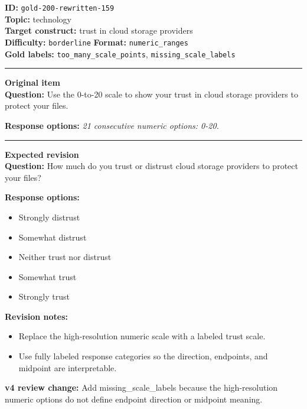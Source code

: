 \documentclass[10pt,a4paper]{article}
\newcommand{\sectionline}{\vspace{0.15em}\hrule\vspace{0.35em}}
\begin{document}
\begin{tcolorbox}[colframe=FlawRed,colback=white,colbacktitle=FlawRed!9,coltitle=black,title={Item 159\hfill Flawed item}]
\textbf{ID:} \texttt{gold-200-rewritten-159}\\
\textbf{Topic:} technology\\
\textbf{Target construct:} trust in cloud storage providers\\
\textbf{Difficulty:} \texttt{borderline} \quad \textbf{Format:} \texttt{numeric\_ranges}\\
\textbf{Gold labels:} \texttt{too\_many\_scale\_points}, \texttt{missing\_scale\_labels}\\
\sectionline
\textbf{Original item}\\
\textbf{Question:} Use the 0-to-20 scale to show your trust in cloud storage providers to protect your files.
\par\textbf{Response options:}
\textit{21 consecutive numeric options: 0-20.}
\sectionline
\textbf{Expected revision}\\
\textbf{Question:} How much do you trust or distrust cloud storage providers to protect your files?
\par\textbf{Response options:}
\begin{itemize}
\item Strongly distrust
\item Somewhat distrust
\item Neither trust nor distrust
\item Somewhat trust
\item Strongly trust
\end{itemize}
\par\textbf{Revision notes:}
\begin{itemize}
\item Replace the high-resolution numeric scale with a labeled trust scale.
\item Use fully labeled response categories so the direction, endpoints, and midpoint are interpretable.
\end{itemize}
\par\textbf{v4 review change:} Add missing\_scale\_labels because the high-resolution numeric options do not define endpoint direction or midpoint meaning.
\end{tcolorbox}
\end{document}
